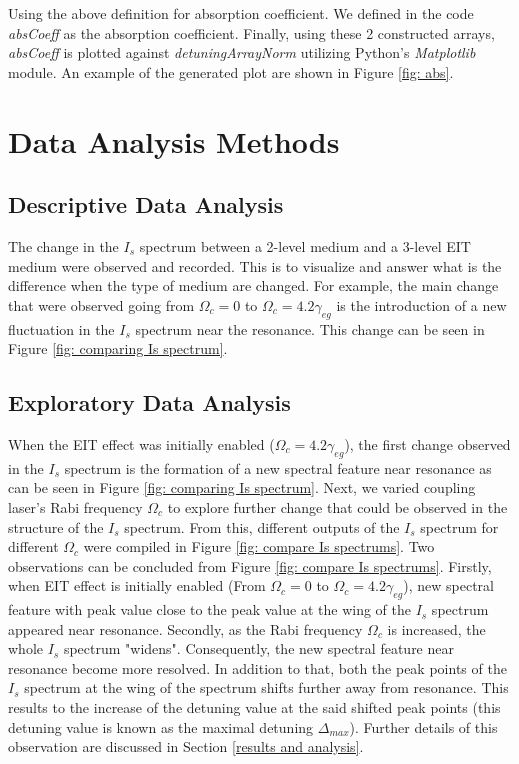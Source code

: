 Using the above definition for absorption coefficient. We defined in the code \textit{absCoeff} as the absorption coefficient. Finally, using these 2 constructed arrays, \textit{absCoeff} is plotted against \textit{detuningArrayNorm} utilizing Python's \textit{Matplotlib} module. An example of the generated plot are shown in Figure \ref{fig: abs}.


\section{Data Analysis Methods}
\subsection{Descriptive Data Analysis}
The change in the $I_{s}$ spectrum between a 2-level medium and a 3-level EIT medium were observed and recorded. This is to visualize and answer what is the difference when the type of medium are changed. For example, the main change that were observed going from $\Omega_{c} = 0$ to $\Omega_{c} = 4.2\gamma_{eg}$ is the introduction of a new fluctuation in the $I_{s}$ spectrum near the resonance. This change can be seen in Figure \ref{fig: comparing Is spectrum}. 

\subsection{Exploratory Data Analysis}
When the EIT effect was initially enabled ($\Omega_{c} = 4.2\gamma_{eg}$), the first change observed in the $I_{s}$ spectrum is the formation of a new spectral feature near resonance as can be seen in Figure \ref{fig: comparing Is spectrum}. Next, we varied coupling laser's Rabi frequency $\Omega_{c}$ to explore further change that could be observed in the structure of the $I_{s}$ spectrum. From this, different outputs of the $I_{s}$ spectrum for different $\Omega_{c}$ were compiled in Figure \ref{fig: compare Is spectrums}. Two observations can be concluded from Figure \ref{fig: compare Is spectrums}. Firstly, when EIT effect is initially enabled (From $\Omega_{c} = 0$ to $\Omega_{c} = 4.2\gamma_{eg}$), new spectral feature with peak value close to the peak value at the wing of the $I_{s}$ spectrum appeared near resonance. Secondly, as the Rabi frequency $\Omega_{c}$ is increased, the whole $I_{s}$ spectrum "widens". Consequently, the new spectral feature near resonance become more resolved. In addition to that, both the peak points of the $I_{s}$ spectrum at the wing of the spectrum shifts further away from resonance. This results to the increase of the detuning value at the said shifted peak points (this detuning value is known as the maximal detuning $\Delta_{max}$). Further details of this observation are discussed in Section \ref{results and analysis}.


